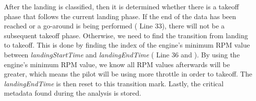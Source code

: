     After the landing is classified, then it is determined whether there is a takeoff phase that follows the current landing phase.  If the end of the data has been reached or a go-around is being performed ( Line 33), there will not be a subsequent takeoff phase.  Otherwise, we need to find the transition from landing to takeoff.  This is done by finding the index of the engine's minimum RPM value between \textit{landingStartTime} and \textit{landingEndTime} ( Line 36 and ).  By using the engine's minimum RPM value, we know all RPM values afterwards will be greater, which means the pilot will be using more throttle in order to takeoff.  The \textit{landingEndTime} is then reset to this transition mark.  Lastly, the critical metadata found during the analysis is stored.
    
